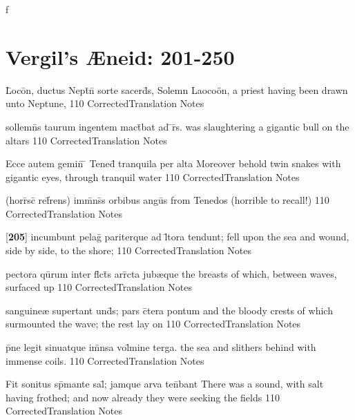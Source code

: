 f\section{Vergil's {\AE}neid: 201-250} %

\latline
  {L\={}oco\={}n, ductus Nept\={}n\={} sorte sacerd\={}s,}
  { Solemn Laoco\"on, a priest having been drawn unto Neptune, }
  {110}
  { CorrectedTranslation }
  { Notes }


\latline
  {sollemn\={\macron {\i}}s taurum ingentem mact\={}bat ad \={}r\={}s.}
  {was slaughtering a gigantic bull on the altars  }
  {110}
  { CorrectedTranslation }
  { Notes }


\latline
  {Ecce autem gemin\={\macron {\i}} \={} Tened\={} tranquila per alta}
  { Moreover behold twin snakes with gigantic eyes, through tranquil water  }
  {110}
  { CorrectedTranslation }
  { Notes }


\latline
  {(horr\={}sc\={} ref\={}rens) imm\={}ns\={\macron {\i}}s orbibus angu\={}s}
  { from Tenedos (horrible to recall!) }
  {110}
  { CorrectedTranslation }
  { Notes }


\latline
  {[\textbf{205}] incumbunt pelag\={} pariterque ad l\={\macron {\i}}tora tendunt;}
  { fell upon the sea and wound, side by side, to the shore;  }
  {110}
  { CorrectedTranslation }
  { Notes }


\latline
  {pectora qu\={}rum inter fl\={}ct\={}s arr\={}cta jub{\ae}que}
  { the breasts of which, between waves, surfaced up  }
  {110}
  { CorrectedTranslation }
  { Notes }


\latline
  {sanguine{\ae} supertant und\={}s; pars c\={}tera pontum}
  { and the bloody crests of which surmounted the wave; the rest lay on  }
  {110}
  { CorrectedTranslation }
  { Notes }


\latline
  {p\={}ne legit sinuatque im\={}nsa vol\={}mine terga.}
  { the sea and slithers behind with immense coils. }
  {110}
  { CorrectedTranslation }
  { Notes }


\latline
  {Fit sonitus sp\={}mante sal\={}; jamque arva ten\={}bant }
  { There was a sound, with salt having frothed; and now already they were seeking the fields }
  {110}
  { CorrectedTranslation }
  { Notes }


